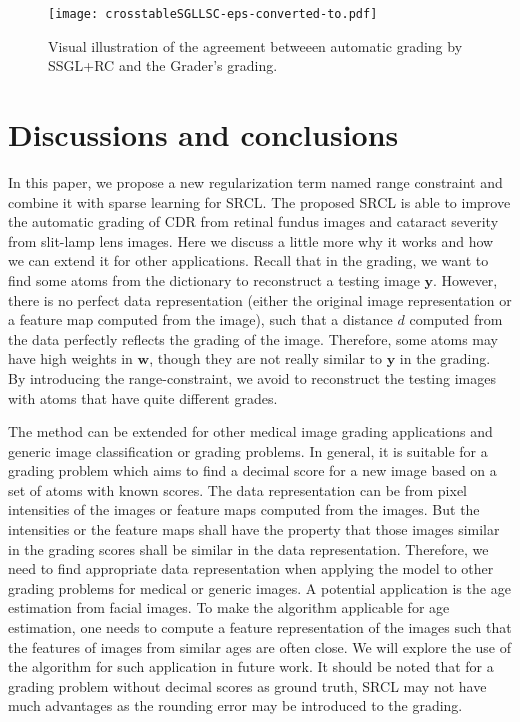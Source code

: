 \documentclass[journal]{IEEEtran}
\begin{document}
\begin{figure}
	\centering

	\texttt{[image: crosstableSGLLSC-eps-converted-to.pdf]}


	\caption{Visual illustration of the agreement betweeen automatic grading by SSGL+RC and the Grader's grading.} \label{fig67}
\end{figure}
\section{Discussions and conclusions} \label{discuss}
In this paper, we propose a new regularization term named range constraint and combine it with sparse learning for SRCL. The proposed SRCL is able to improve the automatic grading of CDR from retinal fundus images and cataract severity from slit-lamp lens images.  Here we discuss a little more why it works and how we can extend it for other applications. Recall that in the grading, we want to find some atoms from the dictionary to reconstruct a testing image $\textbf{y}$. However, there is no perfect data representation  (either the original image representation or a feature map computed from the image), such that a distance $d$ computed from the data perfectly reflects the grading of the image. Therefore,  some atoms may have high weights in $\textbf{w}$, though they are not really similar to $\textbf{y}$ in the grading. By introducing the range-constraint, we avoid to reconstruct the testing images with atoms that have quite different grades.

The method can be extended for other medical image grading
applications and generic image classification or grading
problems. In general, it is suitable for a grading problem which
aims to find a decimal score for a new image based on a set
of atoms with known scores. The data representation can be
from pixel intensities of the images or feature maps computed
from the images. But the intensities or the feature maps shall
have the property that those images similar in the grading
scores shall be similar in the data representation. Therefore,
we need to find appropriate data representation when applying
the model to other grading problems for medical or generic
images. A potential application is the age estimation from
facial images. To make the algorithm applicable for age
estimation, one needs to compute a feature representation of
the images such that the features of images from similar ages
are often close. We will explore the use of the algorithm for
such application in future work. It should be noted that for
a grading problem without decimal scores as ground truth,
SRCL may not have much advantages as the rounding error
may be introduced to the grading.
\end{document}
